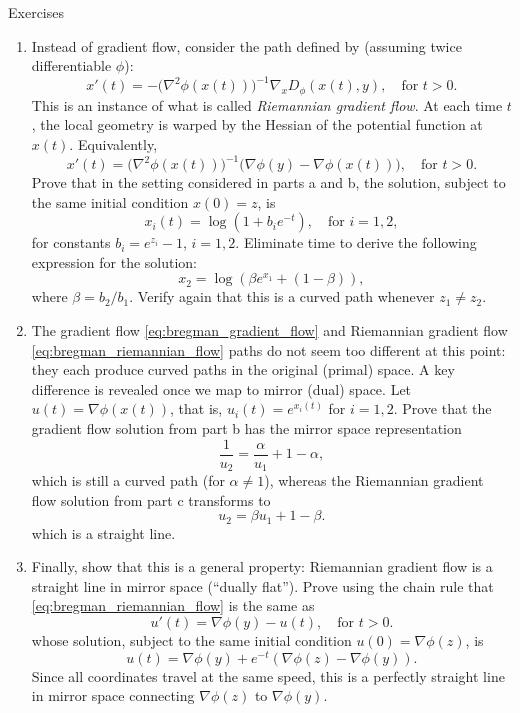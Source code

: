 \begin{xcb}{Exercises}
\begin{enumerate}[label=\thechapter.\arabic*]
\begin{enumerate}[label=\alph*.]
\item Instead of gradient flow, consider the path defined by (assuming twice
  differentiable $\phi$): 
  \[
  x'(t) = - \big( \nabla^2 \phi(x(t)) \big)^{-1} \nabla_x D_\phi(x(t),y), \quad
  \text{for $t > 0$}.
  \]
  This is an instance of what is called \emph{Riemannian gradient flow}. At each
  time $t$, the local geometry is warped by the Hessian of the potential
  function at $x(t)$. Equivalently, 
  \begin{equation} 
  \label{eq:bregman_riemannian_flow}
  x'(t) = \big(\nabla^2 \phi(x(t)) \big)^{-1} \big( \nabla\phi(y) -
  \nabla\phi(x(t)) \big), \quad \text{for $t > 0$}. 
  \end{equation}
  Prove that in the setting considered in parts a and b, the solution, subject
  to the same initial condition $x(0) = z$, is   
  \[
  x_i(t) = \log(1 + b_i e^{-t}), \quad \text{for $i=1,2$},
  \]
  for constants $b_i = e^{z_i}-1$, $i=1,2$. Eliminate time to derive the
  following expression for the solution:
  \[
  x_2 = \log(\beta e^{x_1} + (1-\beta)),
  \]
  where $\beta = b_2/b_1$. Verify again that this is a curved path whenever $z_1
  \not= z_2$.   

\item The gradient flow \eqref{eq:bregman_gradient_flow} and Riemannian
  gradient flow \eqref{eq:bregman_riemannian_flow} paths do not seem too
  different at this point: they each produce curved paths in the original (primal) 
  space. A key difference is revealed once we map to mirror (dual) space. Let 
  $u(t) = \nabla\phi(x(t))$, that is, $u_i(t) = e^{x_i(t)}$ for $i=1,2$. Prove
  that the gradient flow solution from part b has the mirror space
  representation   
  \[
  \frac{1}{u_2} = \frac{\alpha}{u_1} + 1-\alpha,
  \]
  which is still a curved path (for $\alpha \not= 1$), whereas the Riemannian
  gradient flow solution from part c transforms to
  \[
  u_2 = \beta u_1 + 1-\beta.
  \]
  which is a straight line.

\item Finally, show that this is a general property: Riemannian gradient flow
  is a straight line in mirror space (``dually flat''). Prove using the chain
  rule that \eqref{eq:bregman_riemannian_flow} is the same as
  \[
  u'(t) = \nabla\phi(y) - u(t), \quad \text{for $t > 0$}.
  \]
  whose solution, subject to the same initial condition $u(0) = \nabla\phi(z)$,
  is     
  \[
  u(t) = \nabla\phi(y) + e^{-t} (\nabla\phi(z) - \nabla\phi(y)). 
  \]
  Since all coordinates travel at the same speed, this is a perfectly straight
  line in mirror space connecting $\nabla\phi(z)$ to $\nabla\phi(y)$.
\end{enumerate}


\end{enumerate}
\end{xcb}

